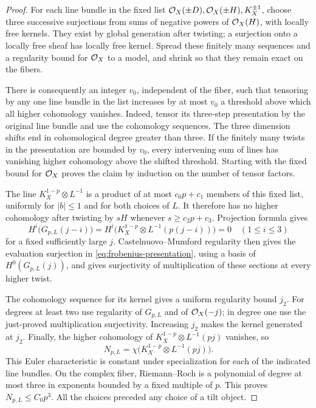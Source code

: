 \begin{proof}
For each line bundle in the fixed list
$\mathcal O_X(\pm D),\mathcal O_X(\pm H),K_X^{\pm1}$, choose three successive
surjections from sums of negative powers of $\mathcal O_X(H)$, with locally
free kernels.  They exist by global generation after twisting; a
surjection onto a locally free sheaf has locally free kernel.
Spread these finitely many sequences and a regularity bound for
$\mathcal O_X$ to a model, and shrink so that they remain exact on the
fibers.

There is consequently an integer $v_0$, independent of the fiber,
such that tensoring by any one line bundle in the list increases by
at most $v_0$ a threshold above which all higher cohomology vanishes.
Indeed, tensor its three-step presentation by the original line
bundle and use the cohomology sequences.  The three dimension shifts
end in cohomological degree greater than three.  If the finitely many
twists in the presentation are bounded by $v_0$, every intervening
sum of lines has vanishing higher cohomology above the shifted
threshold.  Starting with the fixed bound for $\mathcal O_X$ proves the
claim by induction on the number of tensor factors.

The line $K_X^{1-p}\otimes L^{-1}$ is a product of at most $c_0p+c_1$
members of this fixed list, uniformly for $|b|\leq1$ and for both
choices of $L$.  It therefore has no higher cohomology after twisting
by $sH$ whenever $s\geq c_2p+c_3$.  Projection formula gives
\[
 H^i\bigl(G_{p,L}(j-i)\bigr)
 =H^i\bigl(K_X^{1-p}\otimes L^{-1}(p(j-i))\bigr)=0
 \quad(1\leq i\leq3)
\]
for a fixed sufficiently large $j$.  Castelnuovo--Mumford regularity
then gives the evaluation surjection in
\eqref{eq:frobenius-presentation}, using a basis of
$H^0(G_{p,L}(j))$, and gives surjectivity of multiplication of these
sections at every higher twist.

The cohomology sequence for its kernel gives a uniform regularity
bound $j_2$.  For degrees at least two use regularity of $G_{p,L}$
and of $\mathcal O_X(-j)$; in degree one use the just-proved multiplication
surjectivity.  Increasing $j_2$ makes the kernel generated at $j_2$.
Finally, the higher cohomology of
$K_X^{1-p}\otimes L^{-1}(pj)$ vanishes, so
\[
 N_{p,L}=\chi\bigl(K_X^{1-p}\otimes L^{-1}(pj)\bigr).
\]
This Euler characteristic is constant under specialization for
each of the indicated line bundles.  On the complex fiber,
Riemann--Roch is a polynomial of degree at most three in exponents
bounded by a fixed multiple of $p$.  This proves $N_{p,L}\leq C_0p^3$.
All the choices preceded any choice of a tilt object.
\end{proof}

